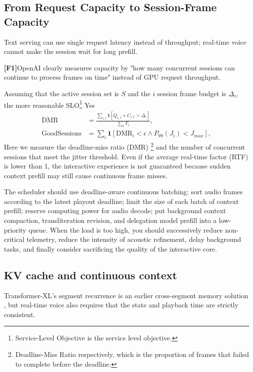 \documentclass[UTF8,fontset=none,a4paper,10pt]{ctexart}
\newcommand{\FOne}{\textcolor{official}{\textbf{[F1]}}}
\begin{document}
\subsection{From Request Capacity to Session-Frame Capacity}

Text serving can use single request latency instead of throughput; real-time voice cannot make the session wait for long prefill.

\FOne OpenAI clearly measures capacity by "how many concurrent sessions can continue to process frames on time" instead of GPU request throughput\cite{en:openai2026continuous}.

Assuming that the active session set is $S$ and the $i$ session frame budget is $\Delta_i$, the more reasonable SLO\footnote{Service-Level Objective is the service level objective. } Yes
\begin{align}
\mathrm{DMR} &= \frac{\sum_{i,t}\mathbf 1[Q_{i,t}+C_{i,t}>\Delta_i]}{\sum_iT_i},\\
\mathrm{GoodSessions} &= \sum_i\mathbf 1[\mathrm{DMR}_i<\epsilon\land P_{99}(J_i)<J_{max}],
\end{align}
Here we measure the deadline-miss ratio (DMR) \footnote{Deadline-Miss Ratio respectively, which is the proportion of frames that failed to complete before the deadline. } and the number of concurrent sessions that meet the jitter threshold. Even if the average real-time factor (RTF) is lower than 1, the interactive experience is not guaranteed because sudden context prefill may still cause continuous frame misses.

The scheduler should use deadline-aware continuous batching: sort audio frames according to the latest playout deadline; limit the size of each batch of context prefill; reserve computing power for audio decode; put background context compaction, transliteration revision, and delegation model prefill into a low-priority queue. When the load is too high, you should successively reduce non-critical telemetry, reduce the intensity of acoustic refinement, delay background tasks, and finally consider sacrificing the quality of the interactive core.

\subsection{KV cache and continuous context}

Transformer-XL's segment recurrence is an earlier cross-segment memory solution \cite{en:dai2019transformerxl}, but real-time voice also requires that the state and playback time are strictly consistent.
\end{document}
